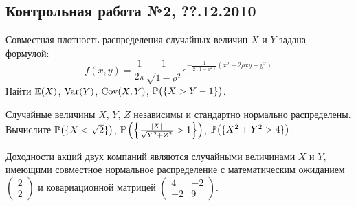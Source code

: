 \documentclass[12pt, a4paper]{article}\usepackage[]{graphicx}\usepackage[]{color}
\newenvironment{enumerate*}{
\begin{enumerate}
  \setlength{\itemsep}{0pt}
  \setlength{\parskip}{0pt}
  \setlength{\parsep}{0pt}
}{\end{enumerate}}
\newcommand{\ofbr}[1]{\bigl( \{ #1 \} \bigr)}     %
\begin{document}
\subsection{Контрольная работа №2, ??.12.2010}
\begin{enumerate*}
\item Совместная плотность распределения случайных величин $X$ и $Y$ задана формулой:
\[
f(x,y)=\frac{1}{2\pi}\frac{1}{\sqrt{1-\rho^2}}e^{-\frac{1}{2(1-\rho^2)}\left(x^2-2\rho xy+y^2\right)}
\]
Найти $\E(X)$, $\Var(Y)$, $\Cov(X,Y)$, $\P\ofbr{X>Y-1}$.
\item Случайные величины $X$, $Y$, $Z$ независимы и стандартно нормально распределены. Вычислите
$\P\ofbr{X<\sqrt2}$, $\P\left(\left\{ \frac{|X|}{\sqrt{Y^2+Z^2}}>1\right\}\right)$, $\P\ofbr{X^2+Y^2>4}$.
\item Доходности акций двух компаний являются случайными величинами $X$ и $Y$, имеющими совместное нормальное распределение с математическим ожиданием $\left( \begin{array}{c}2\\2\end{array}\right)$ и ковариационной матрицей $\left( \begin{array}{cc}4 & -2\\-2 & 9\end{array}\right)$.


\end{enumerate*}
\end{document}

